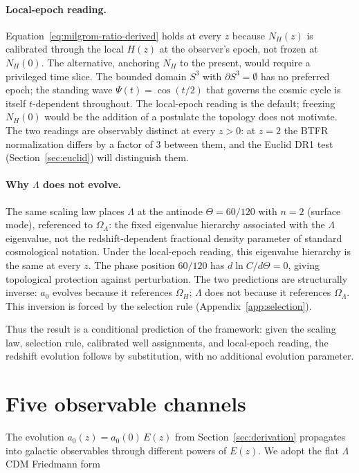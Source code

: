 \documentclass[11pt,a4paper]{article}
\numberwithin{equation}{section}
\numberwithin{table}{section}
\numberwithin{figure}{section}
\newcommand{\afid}{a_0}
\newcommand{\Ez}{E(z)}
\begin{document}
\paragraph{Local-epoch reading.}
Equation~\eqref{eq:milgrom-ratio-derived} holds at every $z$ because
$N_H(z)$ is calibrated through the local $H(z)$ at the observer's
epoch, not frozen at $N_H(0)$. The alternative, anchoring $N_H$ to the
present, would require a privileged time slice. The bounded domain
$S^3$ with $\partial S^3 = \emptyset$ has no preferred epoch; the
standing wave $\Psi(t) = \cos(t/2)$ that governs the cosmic cycle is
itself $t$-dependent throughout. The local-epoch reading is the
default; freezing $N_H(0)$ would be the addition of a postulate the
topology does not motivate. The two readings are observably distinct at
every $z > 0$: at $z = 2$ the BTFR normalization differs by a factor of
$3$ between them, and the Euclid DR1 test
(Section~\ref{sec:euclid}) will distinguish them.

\paragraph{Why $\Lambda$ does not evolve.} The same scaling law places
$\Lambda$ at the antinode $\Theta = 60/120$ with $n = 2$ (surface
mode), referenced to $\Omega_\Lambda$: the fixed eigenvalue hierarchy
associated with the $\Lambda$ eigenvalue, not the redshift-dependent
fractional density parameter of standard cosmological notation. Under
the local-epoch reading, this eigenvalue hierarchy is the same at every
$z$. The phase position $60/120$ has $d\ln C/d\Theta = 0$, giving
topological protection against perturbation. The two predictions are
structurally inverse: $\afid$ evolves because it references $\Omega_H$;
$\Lambda$ does not because it references $\Omega_\Lambda$. This
inversion is forced by the selection rule (Appendix~\ref{app:selection}).

Thus the result is a conditional prediction of the framework: given
the scaling law, selection rule, calibrated well assignments, and
local-epoch reading, the redshift evolution follows by substitution,
with no additional evolution parameter.


\section{Five observable channels}
\label{sec:channels}

The evolution $\afid(z) = \afid(0)\,\Ez$ from
Section~\ref{sec:derivation} propagates into galactic observables
through different powers of $\Ez$. We adopt the flat $\Lambda$CDM
Friedmann form
\end{document}
